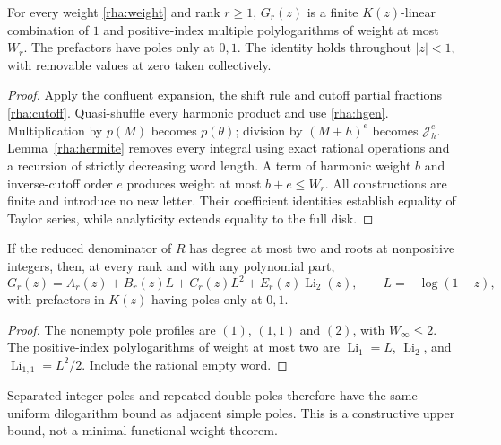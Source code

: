 \begin{theorem}\label{rha:compiler}
For every weight \eqref{rha:weight} and rank $r\ge1$, $G_r(z)$ is a
finite $K(z)$-linear combination of $1$ and positive-index multiple
polylogarithms of weight at most $W_r$. The prefactors have poles only
at $0,1$. The identity holds throughout $|z|<1$, with removable values
at zero taken collectively.
\end{theorem}
\begin{proof}
Apply the confluent expansion, the shift rule and cutoff partial
fractions \eqref{rha:cutoff}. Quasi-shuffle every harmonic product and
use \eqref{rha:hgen}. Multiplication by $p(M)$ becomes $p(\theta)$;
division by $(M+h)^e$ becomes $\mathcal J_h^e$. Lemma~\ref{rha:hermite}
removes every integral using exact rational operations and a recursion
of strictly decreasing word length. A term of harmonic weight $b$ and
inverse-cutoff order $e$ produces weight at most $b+e\le W_r$.
All constructions are finite and introduce no new letter. Their
coefficient identities establish equality of Taylor series, while
analyticity extends equality to the full disk.
\end{proof}

\begin{corollary}
\label{rha:quadratic}
If the reduced denominator of $R$ has degree at most two and roots at
nonpositive integers, then, at every rank and with any polynomial part,
\begin{equation}\label{rha:quadratic-form}
 G_r(z)=A_r(z)+B_r(z)L+C_r(z)L^2+E_r(z)\operatorname{Li}_2(z),
                         \qquad L=-\log(1-z),
\end{equation}
with prefactors in $K(z)$ having poles only at $0,1$.
\end{corollary}
\begin{proof}
The nonempty pole profiles are $(1)$, $(1,1)$ and $(2)$, with
$W_\infty\le2$. The positive-index polylogarithms of weight at most
two are $\operatorname{Li}_1=L$, $\operatorname{Li}_2$, and
$\operatorname{Li}_{1,1}=L^2/2$. Include the rational empty word.
\end{proof}

Separated integer poles and repeated double poles therefore have the
same uniform dilogarithm bound as adjacent simple poles. This is a
constructive upper bound, not a minimal functional-weight theorem.

